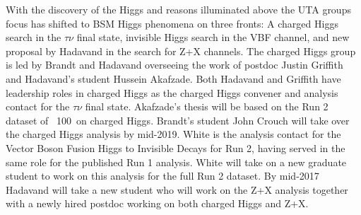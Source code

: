 With the discovery of the Higgs and reasons illuminated above the UTA groups focus has shifted to BSM Higgs phenomena on three fronts: A charged Higgs search in the $\tau \nu$ final state, invisible Higgs search in the VBF channel,
and new proposal by Hadavand in the search for Z+X channels.  The charged Higgs group is led by Brandt and Hadavand overseeing the work of postdoc Justin Griffith and Hadavand's student Hussein Akafzade.
Both Hadavand and Griffith have leadership roles in charged Higgs as the charged Higgs convener and analysis contact for the $\tau \nu$ final state.  Akafzade's thesis will be based on the Run 2 dataset of ~100\invfb\ on charged Higgs.
Brandt's student John Crouch will take over the charged Higgs analysis by mid-2019.
White is the analysis contact for the Vector Boson Fusion Higgs to Invisible Decays for Run 2, having served in the same role for the published Run 1 analysis. White will take on a new graduate student to work on this analysis for the full Run 2 dataset.
By mid-2017 Hadavand will take a new student who will work on the Z+X analysis together with a newly hired postdoc working on both charged Higgs and Z+X.  


